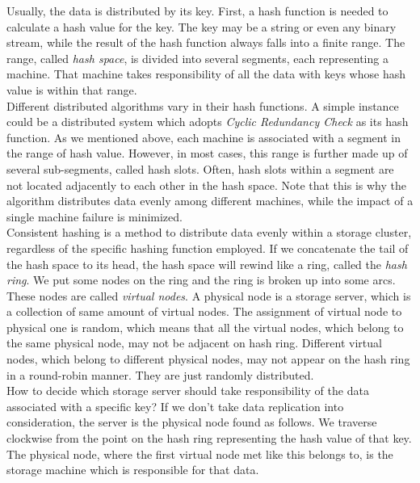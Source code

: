 \documentclass{article}
\begin{document}
Usually, the data is distributed by its key. First, a hash function is needed
to calculate a hash value for the key. The key may be a string or even any
binary stream, while the result of the hash function always falls into a
finite range. The range, called \emph{hash space}, is divided into several
segments, each representing a machine. That machine takes responsibility of
all the data with keys whose hash value is within that range.\\

Different distributed algorithms vary in their hash functions. A simple
instance could be a distributed system which adopts \emph{Cyclic Redundancy
Check} as its hash function. As we mentioned above, each machine is associated
with a segment in the range of hash value. However, in most cases, this range
is further made up of several sub-segments, called hash slots. Often, hash
slots within a segment are not located adjacently to each other in the hash
space. Note that this is why the algorithm distributes data evenly among
different machines, while the impact of a single machine failure is minimized.\\

Consistent hashing is a method to distribute data evenly within a storage
cluster, regardless of the specific hashing function employed. If we
concatenate the tail of the hash space to its head, the hash space will rewind
like a ring, called the \emph{hash ring}. We put some nodes on the ring and
the ring is broken up into some arcs. These nodes are called \emph{virtual
nodes}. A physical node is a storage server, which is a collection of same
amount of virtual nodes. The assignment of virtual node to physical one is
random, which means that all the virtual nodes, which belong to the same
physical node, may not be adjacent on hash ring. Different virtual nodes,
which belong to different physical nodes, may not appear on the hash ring in a
round-robin manner. They are just randomly distributed.\\
    
How to decide which storage server should take responsibility of the data
associated with a specific key? If we don't take data replication into
consideration, the server is the physical node found as follows. We traverse
clockwise from the point on the hash ring representing the hash value of that
key. The physical node, where the first virtual node met like this belongs to,
is the storage machine which is responsible for that data.\\
\end{document}
